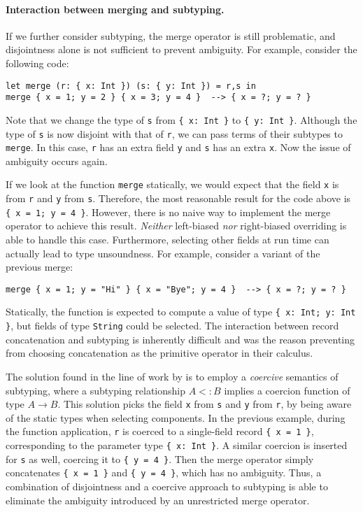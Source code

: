 \paragraph{Interaction between merging and subtyping.}
If we further consider subtyping, the merge operator is still problematic, and
disjointness alone is not sufficient to prevent ambiguity. For example, consider
the following code:
\begin{lstlisting}
let merge (r: { x: Int }) (s: { y: Int }) = r,s in
merge { x = 1; y = 2 } { x = 3; y = 4 }  --> { x = ?; y = ? }
\end{lstlisting}
Note that we change the type of \lstinline{s} from \lstinline|{ x: Int }| to
\lstinline|{ y: Int }|. Although the type of \lstinline{s} is now disjoint with
that of \lstinline{r}, we can pass terms of their subtypes to \lstinline{merge}.
In this case, \lstinline{r} has an extra field \lstinline{y} and \lstinline{s}
has an extra \lstinline{x}. Now the issue of ambiguity occurs again.

If we look at the function \lstinline{merge} statically, we would expect that
the field \lstinline{x} is from \lstinline{r} and \lstinline{y} from
\lstinline{s}. Therefore, the most reasonable result for the code above is
\lstinline|{ x = 1; y = 4 }|. However, there is no naive way to implement the
merge operator to achieve this result. \emph{Neither} left-biased \emph{nor}
right-biased overriding is able to handle this case. Furthermore, selecting
other fields at run time can actually lead to type unsoundness. For example,
consider a variant of the previous merge:
\begin{lstlisting}
merge { x = 1; y = "Hi" } { x = "Bye"; y = 4 }  --> { x = ?; y = ? }
\end{lstlisting}
Statically, the function is expected to compute a value of type
\lstinline|{ x: Int; y: Int }|, but fields of type \lstinline{String} could be
selected. The interaction between record concatenation and subtyping is
inherently difficult and was the reason preventing
\citet{cardelli1991operations} from choosing concatenation as the primitive
operator in their calculus.

The solution found in the line of work by \citet{oliveira2016disjoint} is to
employ a \emph{coercive} semantics of subtyping, where a subtyping relationship
$A <: B$ implies a coercion function of type $A \to B$. This solution picks the
field \lstinline{x} from \lstinline{s} and \lstinline{y} from \lstinline{r}, by
being aware of the static types when selecting components. In the previous
example, during the function application, \lstinline{r} is coerced to a
single-field record \lstinline|{ x = 1 }|, corresponding to the parameter type
\lstinline|{ x: Int }|. A similar coercion is inserted for \lstinline{s} as
well, coercing it to \lstinline|{ y = 4 }|. Then the merge operator simply
concatenates \lstinline|{ x = 1 }| and \lstinline|{ y = 4 }|, which has no
ambiguity. Thus, a combination of disjointness and a coercive approach to
subtyping is able to eliminate the ambiguity introduced by an unrestricted merge
operator.

